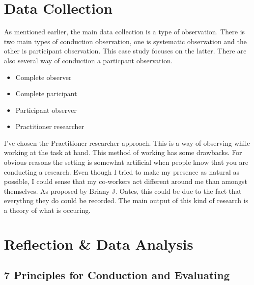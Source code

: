 \section{Data Collection}
As mentioned earlier, the main data collection is a type of observation. There is two main types of conduction observation, one is systematic observation and the other is participant observation. This case study focuses on the latter. There are also several way of conduction a particpant observation.
\begin{itemize}
\item Complete observer
\item Complete paricipant
\item Participant observer
\item Practitioner researcher
\end{itemize}
\cite{13}
I've chosen the Practitioner researcher approach. This is a way of observing while working at the task at hand. This method of working has some drawbacks. For obvious reasons the setting is somewhat artificial when people know that you are conducting a research.
Even though I tried to make my presence as natural as possible, I could sense that my co-workers act different around me than amongst themselves. As proposed by Briany J. Oates\cite{13}, this could be due to the fact that everythng they do could be recorded.
The main output of this kind of research is a theory of what is occuring.
\section{Reflection \& Data Analysis}

\subsection{7 Principles for Conduction and Evaluating}
